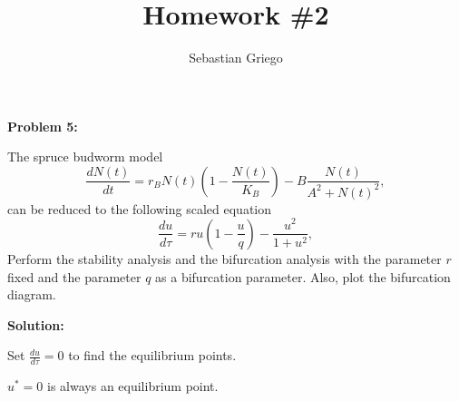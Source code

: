 \documentclass[12pt]{article}
\newenvironment{problem}[1]{
    \textbf{Problem #1:}
}{
    \rmfamily \vspace{1em}
}
\newenvironment{solution}{
    \textbf{Solution:}
    
}{
    
    \vspace{2em}
}
\begin{document}
\title{Homework \#2}  %
\author{Sebastian Griego}  %

\begin{problem}{5}
    The spruce budworm model
    \[
        \frac{dN(t)}{dt} = r_BN(t) \left( 1 - \frac{N(t)}{K_B} \right) - B\frac{N(t)}{A^2+N(t)^2},
    \]
    can be reduced to the following scaled equation
    \[
        \frac{du}{d\tau} = ru(1-\frac{u}{q}) - \frac{u^2}{1+u^2},
    \]
    Perform the stability analysis and the bifurcation analysis with the parameter \( r \) fixed and the parameter \( q \) as a bifurcation parameter. Also, plot the bifurcation diagram.
\end{problem}

\begin{solution}
    Set \(\frac{du}{d\tau} = 0\) to find the equilibrium points.
    
    \(u^*=0\) is always an equilibrium point.
    

\end{solution}
\end{document}
